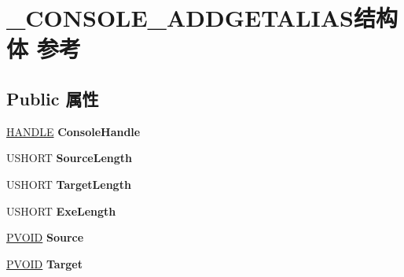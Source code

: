 \hypertarget{struct___c_o_n_s_o_l_e___a_d_d_g_e_t_a_l_i_a_s}{}\section{\+\_\+\+C\+O\+N\+S\+O\+L\+E\+\_\+\+A\+D\+D\+G\+E\+T\+A\+L\+I\+A\+S结构体 参考}
\label{struct___c_o_n_s_o_l_e___a_d_d_g_e_t_a_l_i_a_s}
\subsection*{Public 属性}
\begin{DoxyCompactItemize}
\item 
\mbox{\label{struct___c_o_n_s_o_l_e___a_d_d_g_e_t_a_l_i_a_s_a0dcb271a9f3178af40402203e04ef506}} 
\hyperlink{interfacevoid}{H\+A\+N\+D\+LE} {\bfseries Console\+Handle}
\item 
\mbox{\label{struct___c_o_n_s_o_l_e___a_d_d_g_e_t_a_l_i_a_s_a4d2426c3ab7425c8a4bcb4f376202681}} 
U\+S\+H\+O\+RT {\bfseries Source\+Length}
\item 
\mbox{\label{struct___c_o_n_s_o_l_e___a_d_d_g_e_t_a_l_i_a_s_a309ee8887b0636a7817abac8fec37e68}} 
U\+S\+H\+O\+RT {\bfseries Target\+Length}
\item 
\mbox{\label{struct___c_o_n_s_o_l_e___a_d_d_g_e_t_a_l_i_a_s_a0f68a94b6dc1ca836c0cbfb3b7d24d50}} 
U\+S\+H\+O\+RT {\bfseries Exe\+Length}
\item 
\mbox{\label{struct___c_o_n_s_o_l_e___a_d_d_g_e_t_a_l_i_a_s_a090fac36da2d01c0f59c29cc544c8676}} 
\hyperlink{interfacevoid}{P\+V\+O\+ID} {\bfseries Source}
\item 
\mbox{\label{struct___c_o_n_s_o_l_e___a_d_d_g_e_t_a_l_i_a_s_aa3cd25e1238c43e12c47cebac3cf4149}} 
\hyperlink{interfacevoid}{P\+V\+O\+ID} {\bfseries Target}
\item 
\mbox{\label{struct___c_o_n_s_o_l_e___a_d_d_g_e_t_a_l_i_a_s_a700fec8c844474f946a22a811ef716fb}} 

\end{DoxyCompactItemize}
